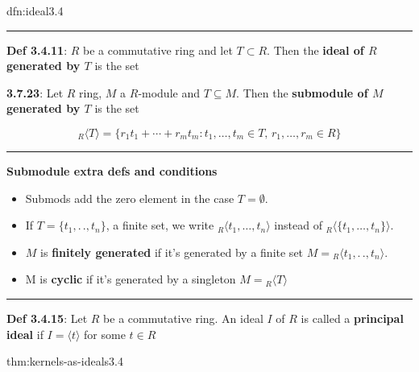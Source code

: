 \documentclass[landscape, 8pt]{extarticle}
\begin{document}
\begin{multicols}{3}
\begin{dfn}{dfn:ideal}{3.4}
    \vspace{-7pt}
    \noindent\rule{\textwidth}{0.2pt}
    \vspace{-23pt}
    \setlength{\columnseprule}{0.5pt}
    \begin{multicols}{2}
        \textbf{Def 3.4.11}: $R$ be a commutative ring and let $T \subset R$. Then the \textbf{ideal of $R$ generated by $T$} is the set

        \columnbreak
        \textbf{3.7.23}: Let $R$ ring, $M$ a $R$-module and $T \subseteq M$. Then the \textbf{submodule of $M$ generated by $T$} is the set

    \end{multicols}
    \vspace{-20pt}

    \[{}_{R}\langle T \rangle = \{r_{1}t_{1}+\cdots+r_{m}t_{m} : t_{1},\dots,t_{m}\in T,\,r_{1},\dots,r_{m}\in R\}\]
    \vspace{-10pt}
    \noindent\rule{\textwidth}{0.2pt}

    \textbf{Submodule extra defs and conditions}
    \vspace{-3pt}
    \begin{itemize}[leftmargin=4pt, rightmargin=-2pt]
        \setlength\itemsep{0em}
        \item Submods add the zero element in the case $T = \emptyset$.
        \item If $T = \{t_{1},.\,.,t_{n}\}$, a finite set, we write ${}_{R}\langle t_{1},\dots,t_{n} \rangle$ instead of ${}_{R}\langle \{t_{1},\dots,t_{n}\} \rangle$.
        \item $M$ is \textbf{finitely generated} if it's generated by a finite set $M = {}_{R}\langle t_{1},.\,.,t_{n} \rangle$.
        \item M is \textbf{cyclic} if it's generated by a singleton $M = {}_{R}\langle T\rangle$
    \end{itemize}
    
    \vspace{-5pt}
    \noindent\rule{\textwidth}{0.2pt}
    \textbf{Def 3.4.15}: Let $R$ be a commutative ring. An ideal $I$ of $R$ is called a \textbf{principal ideal} if $I = \langle t \rangle$ for some $t\in R$
\end{dfn}

\vspace{-5pt}
\begin{thm}{thm:kernels-as-ideals}{3.4}


\end{thm}
\end{multicols}
\end{document}
